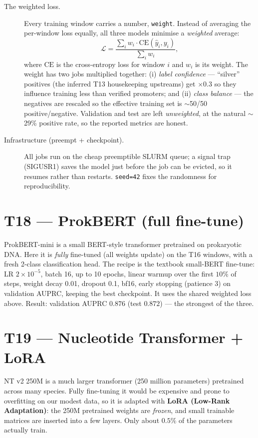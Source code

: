 \documentclass{article}
\begin{document}
\begin{description}
\item[The weighted loss.] Every training window carries a number, \texttt{weight}. Instead of averaging the per-window loss equally, all three models minimise a \emph{weighted} average:
\begin{equation}
\mathcal{L} = \frac{\sum_i w_i \cdot \mathrm{CE}\!\left(\hat{y}_i, y_i\right)}{\sum_i w_i},
\end{equation}
where $\mathrm{CE}$ is the cross-entropy loss for window $i$ and $w_i$ is its weight. The weight has two jobs multiplied together: (i) \emph{label confidence} --- ``silver'' positives (the inferred T13 housekeeping upstreams) get $\times 0.3$ so they influence training less than verified promoters; and (ii) \emph{class balance} --- the negatives are rescaled so the effective training set is $\sim$50/50 positive/negative. Validation and test are left \emph{unweighted}, at the natural $\sim$29\% positive rate, so the reported metrics are honest.

\item[Infrastructure (preempt + checkpoint).] All jobs run on the cheap preemptible SLURM queue; a signal trap (SIGUSR1) saves the model just before the job can be evicted, so it resumes rather than restarts. \texttt{seed=42} fixes the randomness for reproducibility.
\end{description}

\section{T18 --- ProkBERT (full fine-tune)}
ProkBERT-mini is a small BERT-style transformer pretrained on prokaryotic DNA. Here it is \emph{fully} fine-tuned (all weights update) on the T16 windows, with a fresh 2-class classification head. The recipe is the textbook small-BERT fine-tune: LR $2\times10^{-5}$, batch 16, up to 10 epochs, linear warmup over the first $10\%$ of steps, weight decay 0.01, dropout 0.1, bf16, early stopping (patience 3) on validation AUPRC, keeping the best checkpoint. It uses the shared weighted loss above. Result: validation AUPRC $0.876$ (test $0.872$) --- the strongest of the three.

\section{T19 --- Nucleotide Transformer + LoRA}
NT v2 250M is a much larger transformer (250 million parameters) pretrained across many species. Fully fine-tuning it would be expensive and prone to overfitting on our modest data, so it is adapted with \textbf{LoRA (Low-Rank Adaptation)}: the 250M pretrained weights are \emph{frozen}, and small trainable matrices are inserted into a few layers. Only about $0.5\%$ of the parameters actually train.
\end{document}
